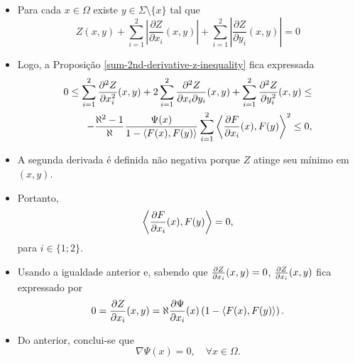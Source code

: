 \documentclass[10pt,a4paper]{beamer}
\theoremstyle{definition}
\begin{document}
\begin{frame}

	\begin{itemize}
		\item Para cada $x \in \Omega$ existe $y \in \Sigma \setminus \{x\}$ tal que
		\begin{equation*}
		Z(x,y) + \sum_{i=1}^{2} \left| \frac{\partial Z}{\partial x_i}(x,y) \right| + \sum_{i=1}^{2} \left| \frac{\partial Z}{\partial y_i}(x,y) \right| = 0
		\end{equation*}
		
		\pause
		
		\item Logo, a Proposição \ref{sum-2nd-derivative-z-inequality} fica expressada
		\begin{align*}
		0 \leq \sum_{i=1}^{2} \frac{\partial^2 Z}{\partial x_i^2}(x,y) + 2 \sum_{i=1}^{2} \frac{\partial^2 Z}{\partial x_i \partial y_i}(x,y) + \sum_{i=1}^{2} \frac{\partial^2 Z}{\partial y_i^2}(x,y) \leq \\
		- \frac{\aleph^2 -1}{\aleph} \frac{\Psi(x)}{1 - \left\langle F(x),F(y) \right\rangle} \sum_{i=1}^{2} \left\langle \frac{\partial F}{\partial x_i}(x),F(y) \right\rangle^2 \leq 0,
		\end{align*}
		
		\pause
		
		\item A segunda derivada é definida não negativa porque $Z$ atinge seu mínimo em $(x,y)$.
	\end{itemize}

\end{frame}

\begin{frame}

	\begin{itemize}
		\item Portanto, 
		\begin{equation*}
		\left\langle \frac{\partial F}{\partial x_i}(x),F(y) \right\rangle = 0,
		\end{equation*}
		para $i \in \{1;2\}$.
		
		\pause
		
		\item Usando a igualdade anterior e, sabendo que $\frac{\partial Z}{\partial x_i}(x,y)=0$, $\frac{\partial Z}{\partial x_i}(x,y)$ fica expressado por
		\begin{equation*}
		0 = \frac{\partial Z}{\partial x_i}(x,y) = \aleph \frac{\partial \Psi}{\partial x_i}(x) \left( 1 - \left\langle F(x),F(y) \right\rangle \right).
		\end{equation*}
		
		\pause
		
		\item Do anterior, conclui-se que
		\begin{equation*}
		\nabla \Psi(x) = 0, \quad \forall x \in \Omega.
		\end{equation*}
	\end{itemize}

\end{frame}	
	
\end{document}
